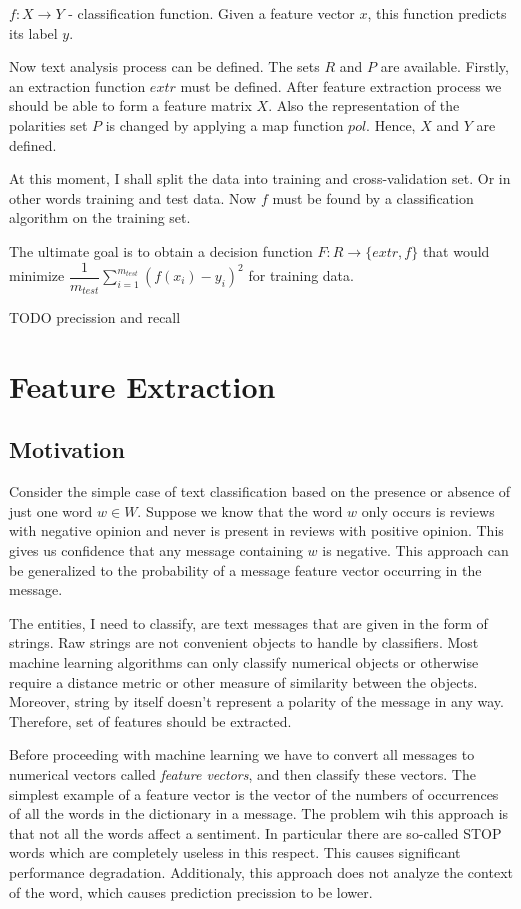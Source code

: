\documentclass[12pt]{report}
\begin{document}
$f: X \rightarrow Y$ - classification function. Given a feature vector $x$, this function predicts its label $y$.

Now text analysis process can be defined. The sets $R$ and $P$ are available.
Firstly, an extraction function $extr$ must be defined. After feature extraction process we should be able to form a feature matrix $X$. Also the representation of the polarities set $P$ is changed by applying a map function $pol$. Hence, $X$ and $Y$ are defined.

At this moment, I shall split the data into training and cross-validation set. Or in other words training and test data. Now $f$ must be found by a classification algorithm on the training set.

The ultimate goal is to obtain a decision function $F : R \rightarrow \{extr, f\}$ that would minimize $\dfrac1 {m_{test}} \sum_{i=1}^{m_{test}} (f(x_{i})- y_{i})^2$ for training data. 

TODO precission and recall

\newpage

\chapter{Feature Extraction}

\section{Motivation}

Consider the simple case of text classification based on the presence or absence of just one word $w \in W$. Suppose we know that the word $w$ only occurs is reviews with negative opinion and never is present in reviews with positive opinion. This gives us confidence that any message containing $w$ is negative. This approach can be generalized to the probability of a message feature vector occurring in the message.

The entities, I need to classify, are text messages that are given in the form of strings. Raw strings are not convenient objects to handle by classifiers. Most machine learning algorithms can only classify numerical objects or otherwise require a distance metric or other measure of similarity between the objects. Moreover, string by itself doesn't represent a polarity of the message in any way. Therefore, set of features should be extracted.

Before proceeding with machine learning we have to convert all messages to numerical vectors called \textit{feature vectors}, and then classify these vectors. The simplest example of a feature vector is the vector of the numbers of occurrences of all the words in the dictionary in a message. The problem wih this approach is that not all the words affect a sentiment. In particular there are so-called STOP words which are completely useless in this respect. This causes significant performance degradation. Additionaly, this approach does not analyze the context of the word, which causes prediction precission to be lower.
\end{document}
